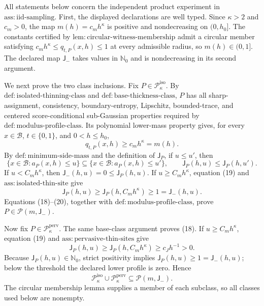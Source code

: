 All statements below concern the independent product experiment in \(\mathrm{ass:iid\text{-}sampling}\).  First, the displayed declarations are well typed.  Since \(\kappa>2\) and \(c_m>0\), the map \(m(h)=c_mh^\kappa\) is positive and nondecreasing on \((0,h_0]\).  The constants certified by \(\mathrm{lem:circular\text{-}witness\text{-}membership}\) admit a circular member satisfying \(c_mh^\kappa\le q_{t,P}(x,h)\le1\) at every admissible radius, so \(m(h)\in(0,1]\).  The declared map \(\mathsf J_{-}\) takes values in \(\mathbb N_0\) and is nondecreasing in its second argument.

We next prove the two class inclusions.  Fix \(P\in\mathcal P_\kappa^{\mathrm{iso}}\).  By \(\mathrm{def:isolated\text{-}thinning\text{-}class}\) and \(\mathrm{def:base\text{-}thickness\text{-}class}\), \(P\) has all sharp-assignment, consistency, boundary-entropy, Lipschitz, bounded-trace, and centered score-conditional sub-Gaussian properties required by \(\mathrm{def:modulus\text{-}profile\text{-}class}\).  Its polynomial lower-mass property gives, for every \(x\in\mathcal B\), \(t\in\{0,1\}\), and \(0<h\le h_0\),
\[
 q_{t,P}(x,h)\ge c_mh^\kappa=m(h). \tag{18}
\]
By \(\mathrm{def:minimum\text{-}side\text{-}mass}\) and the definition of \(\mathsf J_P\), if \(u\le u'\), then
\[
 \{x\in\mathcal B:a_P(x,h)\le u\}
 \subseteq
 \{x\in\mathcal B:a_P(x,h)\le u'\},
 \qquad
 \mathsf J_P(h,u)\le\mathsf J_P(h,u'). \tag{19}
\]
If \(u<C_mh^\kappa\), then \(\mathsf J_{-}(h,u)=0\le\mathsf J_P(h,u)\).  If \(u\ge C_mh^\kappa\), equation (19) and \(\mathrm{ass:isolated\text{-}thin\text{-}site}\) give
\[
 \mathsf J_P(h,u)
 \ge\mathsf J_P(h,C_mh^\kappa)
 \ge1
 =\mathsf J_{-}(h,u). \tag{20}
\]
Equations (18)--(20), together with \(\mathrm{def:modulus\text{-}profile\text{-}class}\), prove \(P\in\mathcal P(m,\mathsf J_{-})\).

Now fix \(P\in\mathcal P_\kappa^{\mathrm{perv}}\).  The same base-class argument proves (18).  If \(u\ge C_mh^\kappa\), equation (19) and \(\mathrm{ass:pervasive\text{-}thin\text{-}sites}\) give
\[
 \mathsf J_P(h,u)
 \ge\mathsf J_P(h,C_mh^\kappa)
 \ge c_Jh^{-1}>0.
\]
Because \(\mathsf J_P(h,u)\in\mathbb N_0\), strict positivity implies \(\mathsf J_P(h,u)\ge1=\mathsf J_{-}(h,u)\); below the threshold the declared lower profile is zero.  Hence
\[
 \mathcal P_\kappa^{\mathrm{iso}}\cup
 \mathcal P_\kappa^{\mathrm{perv}}
 \subseteq\mathcal P(m,\mathsf J_{-}). \tag{21}
\]
The circular membership lemma supplies a member of each subclass, so all classes used below are nonempty.

